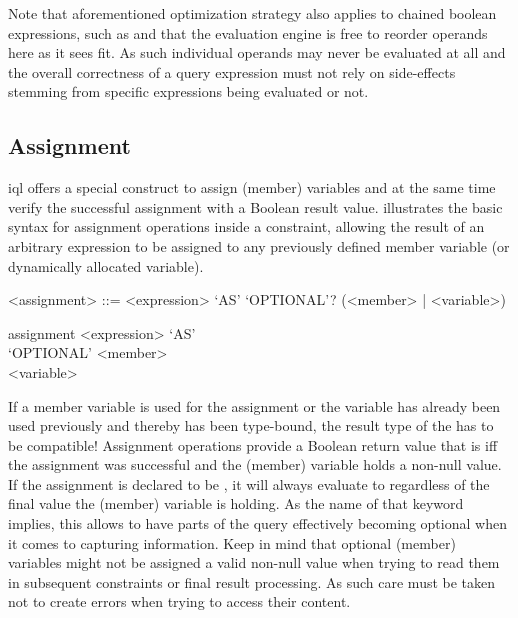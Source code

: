 \documentclass[11pt,a4paper]{report}
\begin{document}
Note that aforementioned optimization strategy also applies to chained boolean expressions, such as  and that the evaluation engine is free to reorder operands here as it sees fit.
As such individual operands may never be evaluated at all and the overall correctness of a query expression must not rely on side-effects stemming from specific expressions being evaluated or not.

\subsection{Assignment}
\label{sec:assignment}

\ac{iql} offers a special construct to assign (member) variables and at the same time verify the successful assignment with a Boolean result value. 
 illustrates the basic syntax for assignment operations inside a constraint, allowing the result of an arbitrary expression to be assigned to any previously defined member variable (or dynamically allocated variable).

\begin{gram}
	\label{gram:assignment}
	\begin{grammar}	
		<assignment> ::= <expression> `AS' `OPTIONAL'? (<member> | <variable>)
	\end{grammar}
	\diagsep
	
	\begin{rrdiag*}{assignment}
		<expression> `AS' \sst \\ `OPTIONAL' \est \sst <member> \\ <variable> \est
	\end{rrdiag*}
\end{gram}

If a member variable is used for the assignment or the variable has already been used previously and thereby has been type-bound, the result type of the  has to be compatible!
Assignment operations provide a Boolean return value that is  iff the assignment was successful and the (member) variable holds a non-null value.
If the assignment is declared to be , it will always evaluate to  regardless of the final value the (member) variable is holding.
As the name of that keyword implies, this allows to have parts of the query effectively becoming optional when it comes to capturing information.
Keep in mind that optional (member) variables might not be assigned a valid non-null value when trying to read them in subsequent constraints or final result processing.
As such care must be taken not to create errors when trying to access their content.
\end{document}
